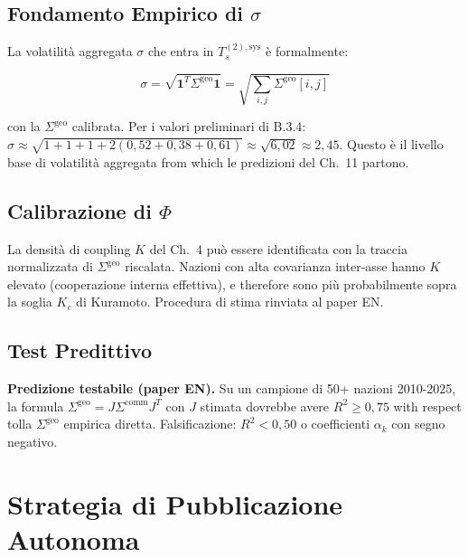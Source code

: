 \subsection{\texorpdfstring{Fondamento Empirico di
\(\sigma\)}{Fondamento Empirico di \textbackslash sigma}}\label{fondamento-empirico-di-sigma}

La volatilità aggregata \(\sigma\) che entra in \(T_s^{(2),\text{sys}}\)
è formalmente:

\[
\sigma = \sqrt{\boldsymbol{1}^T \Sigma^{\text{geo}} \boldsymbol{1}} = \sqrt{\sum_{i,j} \Sigma^{\text{geo}}[i,j]}
\]

con la \(\Sigma^{\text{geo}}\) calibrata. Per i valori preliminari di
B.3.4:
\(\hat\sigma \approx \sqrt{1+1+1+2(0{,}52+0{,}38+0{,}61)} \approx \sqrt{6{,}02} \approx 2{,}45\).
Questo è il livello base di volatilità aggregata from which le predizioni
del Ch.~11 partono.

\subsection{\texorpdfstring{Calibrazione di
\(\Phi\)}{Calibrazione di \textbackslash Phi}}\label{calibrazione-di-phi}

\Hypoth{} La densità di coupling \(K\) del Ch.~4 può essere
identificata con la traccia normalizzata di \(\Sigma^{\text{geo}}\)
riscalata. Nazioni con alta covarianza inter-asse hanno \(K\) elevato
(cooperazione interna effettiva), e therefore sono più probabilmente sopra
la soglia \(K_c\) di Kuramoto. Procedura di stima rinviata al paper EN.

\subsection{Test Predittivo}\label{test-predittivo}

\Conj{} \textbf{Predizione testabile (paper EN).} Su un campione di 50+
nazioni 2010-2025, la formula
\(\Sigma^{\text{geo}} = J \Sigma^{\text{comm}} J^T\) con \(J\) stimata
dovrebbe avere \(R^2 \geq 0{,}75\) with respect tolla \(\Sigma^{\text{geo}}\)
empirica diretta. Falsificazione: \(R^2 < 0{,}50\) o coefficienti
\(\alpha_k\) con segno negativo.



\section{Strategia di Pubblicazione
Autonoma}\label{strategia-di-pubblicazione-autonoma}

